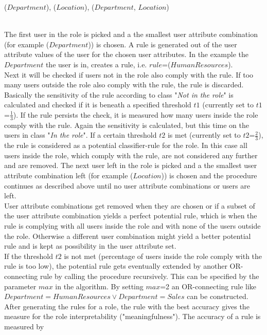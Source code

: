         \centerline{($Department$), ($Location$), ($Department$, $Location$)}\\
        The first user in the role is picked and a the smallest user attribute combination (for example ($Department$)) is chosen. A rule is generated out of the user attribute values of the user for the chosen user attributes. In the example the $Department$ the user is in, creates a rule, i.e. $rule$=($HumanResources$).\\
        Next it will be checked if users not in the role also comply with the rule. If too many users outside the role also comply with the rule, the rule is discarded. Basically the sensitivity of the rule according to class "\textit{Not in the role}" is calculated and checked if it is beneath a specified threshold $t1$ (currently set to $t1$=$\frac{1}{3}$). If the rule persists the check, it is measured how many users inside the role comply with the rule. Again the sensitivity is calculated, but this time on the users in class "\textit{In the role}". If a certain threshold $t2$ is met (currently set to $t2$=$\frac{2}{3}$), the rule is considered as a potential classifier-rule for the role. In this case all users inside the role, which comply with the rule, are not considered any further and are removed. The next user left in the role is picked and a the smallest user attribute combination left (for example ($Location$)) is chosen and the procedure continues as described above until no user attribute combinations or users are left.\\
        User attribute combinations get removed when they are chosen or if a subset of the user attribute combination yields a perfect potential rule, which is when the rule is complying with all users inside the role and with none of the users outside the role. Otherwise a different user combination might yield a better potential rule and is kept as possibility in the user attribute set.\\
        If the threshold $t2$ is not met (percentage of users inside the role comply with the rule is too low), the potential rule gets eventually extended by another OR-connecting rule by calling the procedure recursively. This can be specified by the parameter $max$ in the algorithm. By setting $max$=2 an OR-connecting rule like $Department=HumanResources \vee Department=Sales$ can be constructed.\\
        After generating the rules for a role, the rule with the best accuracy gives the measure for the role interpretability ("meaningfulness"). The accuracy of a rule is measured by
